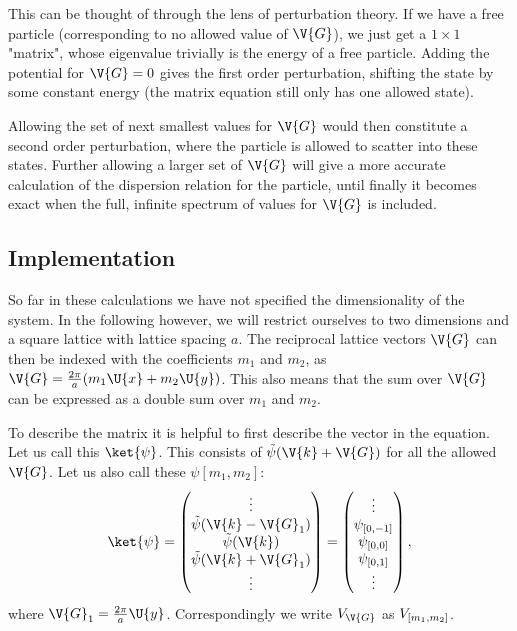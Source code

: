 \documentclass[main.tex]{subfiles}
\begin{document}
	This can be thought of through the lens of perturbation theory. If we have a free particle (corresponding to no allowed value of $ \V{G} $), we just get a $ 1\times 1$ "matrix", whose eigenvalue trivially is the energy of a free particle. Adding the potential for $ \V{G} = 0 $ gives the first order perturbation, shifting the state by some constant energy (the matrix equation still only has one allowed state).
	
	Allowing the set of next smallest values for $ \V{G} $ would then constitute a second order perturbation, where the particle is allowed to scatter into these states. Further allowing a larger set of $ \V{G} $ will give a more accurate calculation of the dispersion relation for the particle, until finally it becomes exact when the full, infinite spectrum of values for $ \V{G} $ is included.
	
	\subsection{Implementation}
	So far in these calculations we have not specified the dimensionality of the system. In the following however, we will restrict ourselves to two dimensions and a square lattice with lattice spacing $ a $. The reciprocal lattice vectors $ \V{G} $ can then be indexed with the coefficients $ m_1 $ and $ m_2 $, as $ \V{G} = \frac{2\pi}{a} (m_1 \U{x} + m_2 \U{y}) $. This also means that the sum over $ \V{G} $ can be expressed as a double sum over $ m_1 $ and $ m_2 $. 
	
	To describe the matrix it is helpful to first describe the vector in the equation. Let us call this $ \ket{\psi} $. This consists of $ \tilde{\psi} (\V{k}+\V{G}) $ for all the allowed $ \V{G} $. Let us also call these $ \psi[m_1, m_2] $:
	\begin{equation}
		\ket{\psi} = \begin{pmatrix}
		\vdots \\ \tilde{\psi}(\V{k}-\V{G}_1) \\ \tilde{\psi}(\V{k}) \\ \tilde{\psi}(\V{k}+\V{G}_1) \\ \vdots
		\end{pmatrix} = \begin{pmatrix}
		\vdots \\ \psi\coef{0, -1}\\ \psi\coef{0, 0} \\ \psi\coef{0, 1} \\ \vdots
		\end{pmatrix},
	\end{equation}
	where $ \V{G}_1 = \frac{2\pi}{a} \U{y}$. Correspondingly we write $ V_{\V{G}} $ as $ V_{[m_1, m_2]} $.
\end{document}
